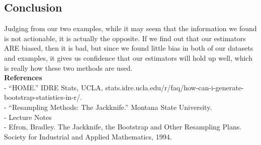 \documentclass[12pt]{article}
\begin{document}
\begin{flushleft}
\section{Conclusion}\label{sec:chapter}
Judging from our two examples, while it may seem that the information we found is not actionable, it is actually the opposite. If we find out that our estimators ARE biased, then it is bad, but since we found little bias in both of our datasets and examples, it gives us confidence that our estimators will hold up well, which is really how these two methods are used.\\



\textbf{References}\\
- “HOME.” IDRE Stats, UCLA, stats.idre.ucla.edu/r/faq/how-can-i-generate-bootstrap-statistics-in-r/.\\
- “Resampling Methods: The Jackknife.” Montana State University.\\
- Lecture Notes\\
- Efron, Bradley. The Jackknife, the Bootstrap and Other Resampling Plans. Society for Industrial and Applied Mathematics, 1994. 























\end{flushleft}
\end{document}
